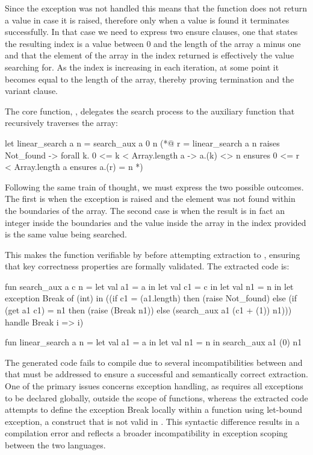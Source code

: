 Since the exception  was not handled this means that the function does not return a value in case it is raised,
therefore only when a value is found it terminates successfully. In that case we need to express two ensure clauses, one that states 
the resulting index is a value between 0 and the length of the array a minus one and that the element of the array in the index returned 
is effectively the value searching for. As the index is increasing in each iteration, at some point it becomes equal to the length of the 
array, thereby proving termination and the variant clause.

The core function, , delegates the search process to the auxiliary function that recursively traverses 
the array:

\begin{gospell}
let linear_search a n = search_aux a 0 n
(*@
  r = linear_search a n
  raises Not_found -> forall k. 0 <= k < Array.length a -> a.(k) <> n
  ensures 0 <= r < Array.length a
  ensures a.(r) = n
*)
\end{gospell}

Following the same train of thought, we must express the two possible outcomes. The first is when the  exception
is raised and the element was not found within the boundaries of the array. The second case is when the result is in fact an integer
inside the boundaries and the value inside the array in the index provided is the same value being searched.

This makes the function verifiable by \whythree before attempting extraction to \cml, ensuring that key correctness properties are 
formally validated. The extracted code is:

\begin{cakeml}
fun search_aux a c n = let val a1 = a in
  let val c1 = c in
  let val n1 = n in
  let exception Break of (int) in
  ((if c1 = (a1.length) then (raise Not_found) 
    else (if (get a1 c1) = n1 then (raise (Break n1)) 
          else (search_aux a1 (c1 + (1)) n1)))
  handle   Break i => i)

fun linear_search a n =
  let val a1 = a in let val n1 = n in search_aux a1 (0) n1
\end{cakeml}

The generated \cml code fails to compile due to several incompatibilities between \ocaml and \cml that must be addressed 
to ensure a successful and semantically correct extraction. One of the primary issues concerns exception handling, as \cml 
requires all exceptions to be declared globally, outside the scope of functions, whereas the extracted code attempts to define 
the exception Break locally within a function using let-bound exception, a construct that is not valid in \cml. This syntactic 
difference results in a compilation error and reflects a broader incompatibility in exception scoping between the two languages.

